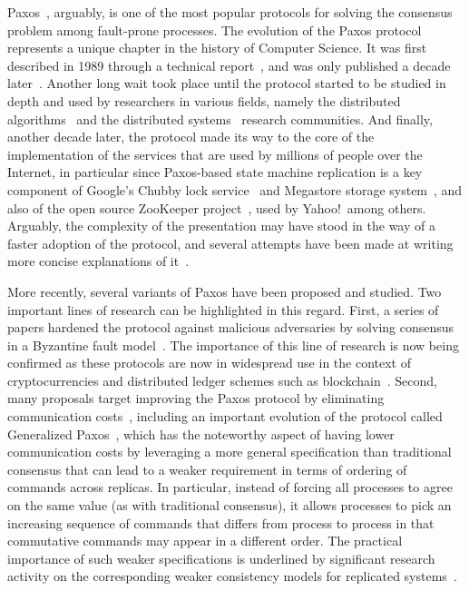 Paxos~\cite{Lamport:1998}, arguably, is one of the most popular protocols for solving the consensus problem among fault-prone processes. The evolution of the Paxos protocol represents a unique chapter in the history of Computer Science. It was first described in 1989 through a technical report~\cite{paxos:tr}, and was only published a decade later~\cite{Lamport:1998}. Another long wait took place until the protocol started to be studied in depth and used by researchers in various fields, namely the distributed algorithms~\cite{Prisco:1997} and the distributed systems~\cite{petal} research communities. And finally, another decade later, the protocol made its way to the core of the implementation of the services that are used by millions of people over the Internet, in particular since Paxos-based state machine replication is a key component of Google's Chubby lock service~\cite{Burrows2006} and Megastore storage system~\cite{36971}, and also of the open source ZooKeeper project~\cite{Hunt2010}, used by Yahoo!\ among others. Arguably, the complexity of the presentation may have stood in the way of a faster
adoption of the protocol, and several attempts have been made at writing more concise explanations of it~\cite{Lamport2001,Renesse2011}.\par

More recently, several variants of Paxos have been proposed and studied. Two important lines of research can be highlighted in this regard. First, a series of papers hardened the protocol against malicious adversaries by solving consensus in a Byzantine fault
model~\cite{Martin2006,Lamport2011}. The importance of this line of research is now being confirmed as these protocols are now in widespread use in the context of cryptocurrencies and distributed ledger schemes such as blockchain~\cite{bitcoin}. Second, many proposals target improving the Paxos protocol by eliminating communication costs~\cite{Lamport2006}, including an important evolution of the protocol called Generalized
Paxos~\cite{Lamport2005}, which has the noteworthy aspect of having lower communication costs by leveraging a more general specification than traditional consensus 
that can lead to a weaker requirement in terms of ordering of commands across replicas. In particular, instead of forcing all processes to agree on the same value (as with traditional consensus), it allows processes to pick an increasing sequence of commands that differs from process to process in that commutative commands may appear in a different order. The practical importance of such weaker specifications is underlined
by significant research activity on the corresponding weaker consistency models for replicated systems~\cite{Ladin:1990,dynamo}.\par

